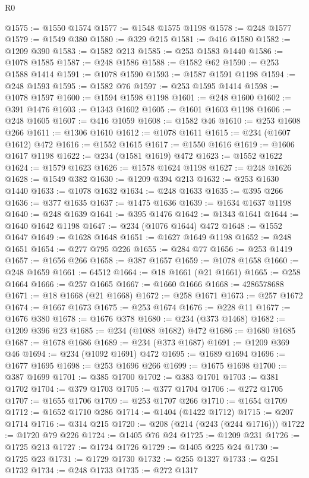 \begin{lexlean}{R0}
\begin{coremodule}
@1575 := @1550 @1574
@1577 := @1548 @1575 @1198
@1578 := @248 @1577
@1579 := @1549 @380
@1580 := @329 @215
@1581 := @416 @1580
@1582 := @1209 @390
@1583 := @1582 @213
@1585 := @253 @1583 @1440
@1586 := @1078 @1585
@1587 := @248 @1586
@1588 := @1582 @62
@1590 := @253 @1588 @1414
@1591 := @1078 @1590
@1593 := @1587 @1591 @1198
@1594 := @248 @1593
@1595 := @1582 @76
@1597 := @253 @1595 @1414
@1598 := @1078 @1597
@1600 := @1594 @1598 @1198
@1601 := @248 @1600
@1602 := @391 @1476
@1603 := @1343 @1602
@1605 := @1601 @1603 @1198
@1606 := @248 @1605
@1607 := @416 @1059
@1608 := @1582 @46
@1610 := @253 @1608 @266
@1611 := @1306 @1610
@1612 := @1078 @1611
@1615 := @234 (@1607 @1612) @472
@1616 := @1552 @1615
@1617 := @1550 @1616
@1619 := @1606 @1617 @1198
@1622 := @234 (@1581 @1619) @472
@1623 := @1552 @1622
@1624 := @1579 @1623
@1626 := @1578 @1624 @1198
@1627 := @248 @1626
@1628 := @1549 @382
@1630 := @1209 @394 @213
@1632 := @253 @1630 @1440
@1633 := @1078 @1632
@1634 := @248 @1633
@1635 := @395 @266
@1636 := @377 @1635
@1637 := @1475 @1636
@1639 := @1634 @1637 @1198
@1640 := @248 @1639
@1641 := @395 @1476
@1642 := @1343 @1641
@1644 := @1640 @1642 @1198
@1647 := @234 (@1076 @1644) @472
@1648 := @1552 @1647
@1649 := @1628 @1648
@1651 := @1627 @1649 @1198
@1652 := @248 @1651
@1654 := @277 @795 @226
@1655 := @284 @77
@1656 := @253 @1419
@1657 := @1656 @266
@1658 := @387 @1657
@1659 := @1078 @1658
@1660 := @248 @1659
@1661 := 64512
@1664 := @18 @1661 (@21 @1661)
@1665 := @258 @1664
@1666 := @257 @1665
@1667 := @1660 @1666
@1668 := 4286578688
@1671 := @18 @1668 (@21 @1668)
@1672 := @258 @1671
@1673 := @257 @1672
@1674 := @1667 @1673
@1675 := @253 @1674
@1676 := @228 @11
@1677 := @1676 @380
@1678 := @1676 @378
@1680 := @234 (@373 @1468)
@1682 := @1209 @396 @23
@1685 := @234 (@1088 @1682) @472
@1686 := @1680 @1685
@1687 := @1678 @1686
@1689 := @234 (@373 @1687)
@1691 := @1209 @369 @46
@1694 := @234 (@1092 @1691) @472
@1695 := @1689 @1694
@1696 := @1677 @1695
@1698 := @253 @1696 @266
@1699 := @1675 @1698
@1700 := @387 @1699
@1701 := @385 @1700
@1702 := @383 @1701
@1703 := @381 @1702
@1704 := @379 @1703
@1705 := @377 @1704
@1706 := @272 @1705
@1707 := @1655 @1706
@1709 := @253 @1707 @266
@1710 := @1654 @1709
@1712 := @1652 @1710 @286
@1714 := @1404 (@1422 @1712)
@1715 := @207 @1714
@1716 := @314 @215
@1720 := @208 (@214 (@243 (@244 @1716)))
@1722 := @1720 @79 @226
@1724 := @1405 @76 @24
@1725 := @1209 @231
@1726 := @1725 @213
@1727 := @1724 @1726
@1729 := @1405 @225 @24
@1730 := @1725 @23
@1731 := @1729 @1730
@1732 := @255 @1327
@1733 := @251 @1732
@1734 := @248 @1733
@1735 := @272 @1317

\end{coremodule}
\end{lexlean}

